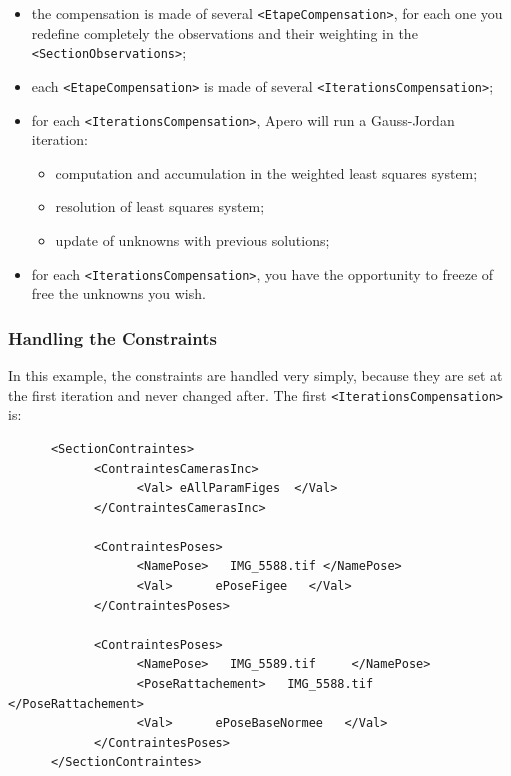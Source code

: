 \begin{itemize}
   \item the compensation is made of several  {\tt <EtapeCompensation>},
         for each one you redefine completely the observations and
         their weighting in the {\tt <SectionObservations>};

   \item  each  {\tt <EtapeCompensation>} is made of several
         {\tt <IterationsCompensation>};

    \item for each  {\tt <IterationsCompensation>}, Apero will
     run a Gauss-Jordan iteration:

\begin{itemize}
      \item computation  and accumulation
            in the weighted least squares system;

      \item resolution of least squares system;

      \item update of unknowns with previous solutions;
\end{itemize}

    \item for each  {\tt <IterationsCompensation>}, you have the
          opportunity to freeze of free the unknowns you wish.
\end{itemize}


\subsubsection{Handling the Constraints}

In this example, the constraints are handled very simply,
because they are set at the first iteration and never changed after.
The first {\tt  <IterationsCompensation>} is:


{\scriptsize
\begin{verbatim}
      <SectionContraintes>
            <ContraintesCamerasInc>
                  <Val> eAllParamFiges  </Val>
            </ContraintesCamerasInc>

            <ContraintesPoses>
                  <NamePose>   IMG_5588.tif </NamePose>
                  <Val>      ePoseFigee   </Val>
            </ContraintesPoses>

            <ContraintesPoses>
                  <NamePose>   IMG_5589.tif     </NamePose>
                  <PoseRattachement>   IMG_5588.tif </PoseRattachement>
                  <Val>      ePoseBaseNormee   </Val>
            </ContraintesPoses>
      </SectionContraintes>

\end{verbatim}
}

